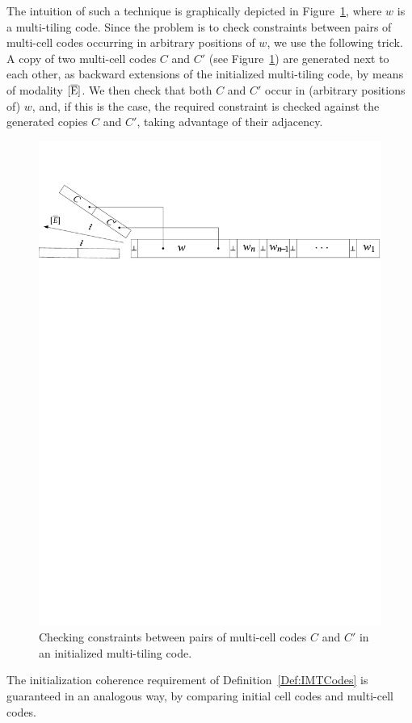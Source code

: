 The intuition of such a technique is graphically depicted in Figure~\ref{fig:multicod}, where $w$ is a multi-tiling code.
Since the problem is to check constraints between pairs of multi-cell codes occurring in arbitrary positions of $w$, we use the following trick. A copy of two multi-cell codes $C$ and $C'$ (see Figure~\ref{fig:multicod}) are generated next to each other, as backward extensions of the initialized multi-tiling code, by means of modality $\operatorname{\mathopen[ \overline{E} \mathclose]}$. We then check that both $C$ and $C'$ occur in (arbitrary positions of) $w$, and, if this is the case, the required constraint is checked against the generated copies $C$ and $C'$, taking advantage of their adjacency. 
%
\begin{figure}[tp]
    \centering
    \includegraphics[width=\textwidth]{Chaps/Gandalf17RIVISTA/multicod.pdf}
    \caption{Checking constraints between pairs of multi-cell codes $C$ and $C'$ in an initialized multi-tiling code.}
    \label{fig:multicod}
\end{figure}
%
The initialization coherence requirement of Definition~\ref{Def:IMTCodes} is guaranteed in an analogous way, by comparing initial cell codes and multi-cell codes.

